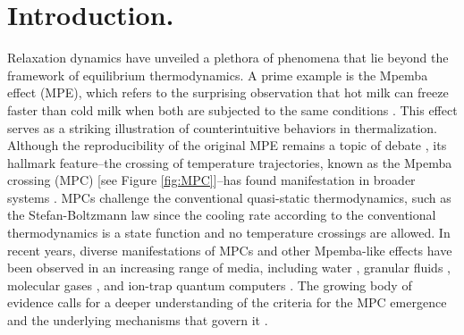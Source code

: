 \documentclass[prl,superscriptaddress,notitlepage,showpacs,twocolumn]{revtex4-2}
\begin{document}
\maketitle
%
%
\section{Introduction.}
Relaxation dynamics have unveiled a plethora of phenomena that lie beyond the framework of equilibrium thermodynamics. A prime example is the Mpemba effect (MPE), which refers to the surprising observation that hot milk can freeze faster than cold milk when both are subjected to the same conditions \cite{mpemba1969cool}. This effect serves as a striking illustration of counterintuitive behaviors in thermalization. %
Although the reproducibility of the original MPE remains a topic of debate \cite{burridge2016questioning,jin2015mechanisms}, its hallmark feature--the crossing of temperature trajectories, known as the Mpemba crossing (MPC) [see Figure \ref{fig:MPC}]--has found manifestation in broader systems \cite{chalas2024multiple,klich2019mpemba,wang2024mpemba}. MPCs challenge the conventional quasi-static thermodynamics, such as the Stefan-Boltzmann law since the cooling rate according to the conventional thermodynamics is a state function and no temperature crossings are allowed. %
In recent years, diverse manifestations of MPCs and other Mpemba-like effects have been observed in an increasing range of media, including water \cite{jeng2006mpemba}, granular fluids \cite{lasanta2017hotter,biswas2020mpemba}, molecular gases \cite{megias2022thermal,santos2020mpemba}, and ion-trap quantum computers \cite{shapira2024mpemba,joshi2024observing,zhang2025observation}. The growing body of evidence calls for a deeper understanding of the criteria for the MPC emergence and the underlying mechanisms that govern it \cite{lu2017nonequilibrium}. 
\end{document}
